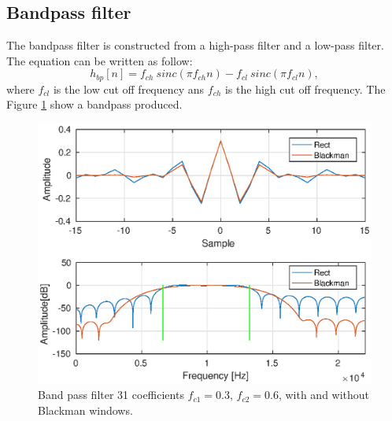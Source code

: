 \documentclass[twoside,twocolumn]{article}
\begin{document}
\subsection{Bandpass filter}
The bandpass filter is constructed from a high-pass filter and a low-pass filter. The equation can be written as follow:
\begin{equation}
	h_{bp}[n]= f_{ch}\  sinc(\pi f_{ch}n) - f_{cl}\  sinc(\pi f_{cl}n), 
\end{equation}
where $f_{cl}$ is the low cut off frequency ans $f_{ch} $ is the high cut off frequency. The Figure \ref{bandpass} show a bandpass produced.
\begin{figure}[h!]
	\centering
	\includegraphics[scale=0.5]{./images/bandpass.eps}
	\caption{Band pass filter 31 coefficients $f_{c1}=0.3$, $f_{c2}=0.6$, with and without Blackman windows.}
	\label{bandpass}
\end{figure}
\end{document}
